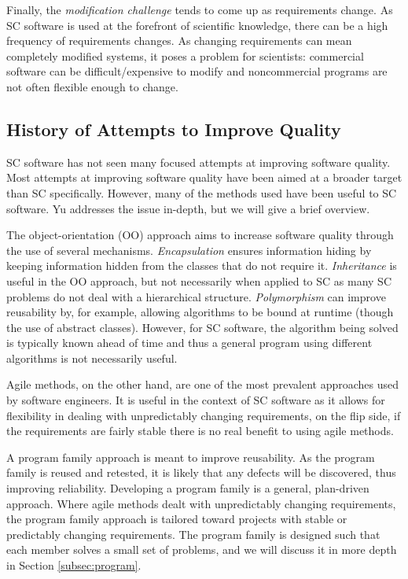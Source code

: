 \documentclass[10pt, preprint]{sigplanconf}
\begin{document}
Finally, the \textit{modification challenge} tends to come up as requirements change. As SC software is used at the forefront of scientific knowledge, there can be a high frequency of requirements changes. As changing requirements can mean completely modified systems, it poses a problem for scientists: commercial software can be difficult/expensive to modify and noncommercial programs are not often flexible enough to change.

\subsection{History of Attempts to Improve Quality}
\label{subsec:history}

SC software has not seen many focused attempts at improving software quality. Most attempts at improving software quality have been aimed at a broader target than SC specifically. However, many of the methods used have been useful to SC software. Yu \cite{Yu2011} addresses the issue in-depth, but we will give a brief overview.

The object-orientation (OO) approach aims to increase software quality through the use of several mechanisms. \textit{Encapsulation} ensures information hiding \cite{Parnas1972} by keeping information hidden from the classes that do not require it. \textit{Inheritance} is useful in the OO approach, but not necessarily when applied to SC as many SC problems do not deal with a hierarchical structure. \textit{Polymorphism} can improve reusability by, for example, allowing algorithms to be bound at runtime (though the use of abstract classes). However, for SC software, the algorithm being solved is typically known ahead of time and thus a general program using different algorithms is not necessarily useful. 

Agile methods, on the other hand, are one of the most prevalent approaches used by software engineers. It is useful in the context of SC software as it allows for flexibility in dealing with unpredictably changing requirements, on the flip side, if the requirements are fairly stable there is no real benefit to using agile methods.

A program family approach is meant to improve reusability. As the program family is reused and retested, it is likely that any defects will be discovered, thus improving reliability. Developing a program family is a general, plan-driven approach. Where agile methods dealt with unpredictably changing requirements, the program family approach is tailored toward projects with stable or predictably changing requirements. The program family is designed such that each member solves a small set of problems, and we will discuss it in more depth in Section \ref{subsec:program}. %
\end{document}

